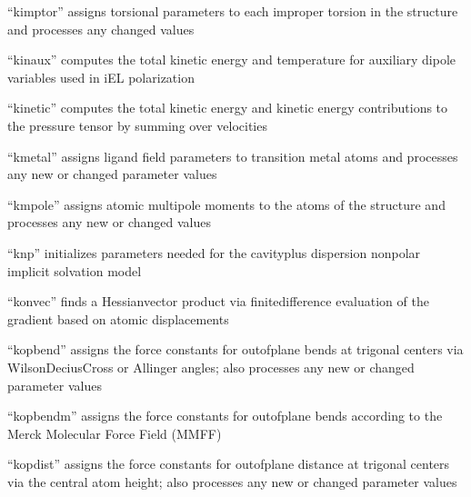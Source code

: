\documentclass[letterpaper,11pt,english]{sphinxmanual}
\begin{document}
“kimptor” assigns torsional parameters to each improper
torsion in the structure and processes any changed values


“kinaux” computes the total kinetic energy and temperature
for auxiliary dipole variables used in iEL polarization


“kinetic” computes the total kinetic energy and kinetic energy
contributions to the pressure tensor by summing over velocities


“kmetal” assigns ligand field parameters to transition metal
atoms and processes any new or changed parameter values


“kmpole” assigns atomic multipole moments to the atoms of
the structure and processes any new or changed values


“knp” initializes parameters needed for the cavity\sphinxhyphen{}plus\sphinxhyphen{}
dispersion nonpolar implicit solvation model


“konvec” finds a Hessian\sphinxhyphen{}vector product via finite\sphinxhyphen{}difference
evaluation of the gradient based on atomic displacements


“kopbend” assigns the force constants for out\sphinxhyphen{}of\sphinxhyphen{}plane bends
at trigonal centers via Wilson\sphinxhyphen{}Decius\sphinxhyphen{}Cross or Allinger angles;
also processes any new or changed parameter values


“kopbendm” assigns the force constants for out\sphinxhyphen{}of\sphinxhyphen{}plane bends
according to the Merck Molecular Force Field (MMFF)


“kopdist” assigns the force constants for out\sphinxhyphen{}of\sphinxhyphen{}plane
distance at trigonal centers via the central atom height;
also processes any new or changed parameter values

\end{document}
